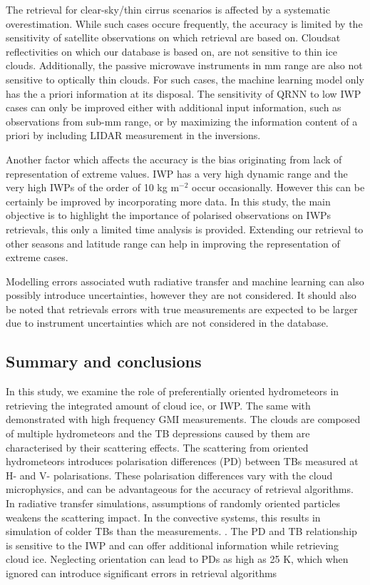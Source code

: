 \documentclass[amt, manuscript]{copernicus}
\begin{document}
The retrieval for clear-sky/thin cirrus scenarios is affected by a systematic overestimation. While such cases occure frequently, the accuracy is limited by the sensitivity of satellite observations on which retrieval are based on. Cloudsat reflectivities on which our database is based on, are not sensitive to thin ice clouds. Additionally, the passive microwave instruments in mm range are also not sensitive to optically thin clouds. For such cases, the machine learning model only has the a priori information at its disposal. The sensitivity of QRNN to low IWP cases can only be improved either with additional input information, such as observations from sub-mm range, or by maximizing the information content of a priori by including LIDAR measurement in the inversions.

Another factor which affects the accuracy is the bias originating from lack of representation of extreme values. IWP has a very high dynamic range and the very high IWPs of the order of 10\,\,kg m$^{-2}$ occur occasionally. However this can be certainly be improved by incorporating more data. In this study, the main objective is to highlight the importance of polarised observations on IWPs retrievals, this only a limited time analysis is provided. Extending our retrieval to other seasons and latitude range can help in improving the representation of extreme cases. 

Modelling errors associated wuth radiative transfer and machine learning can also possibly introduce uncertainties, however they are not considered. 
It should also be noted that retrievals errors with true measurements are expected to be larger due to instrument uncertainties which are not considered in the database. 




\subsection{Summary and conclusions}
%
\label{sec:conclusions}

In this study, we examine the role of preferentially oriented hydrometeors in retrieving the integrated amount of cloud ice, or IWP. The same with demonstrated with high frequency GMI measurements. The clouds are composed of multiple hydrometeors and the TB depressions caused by them are characterised by their scattering effects. The scattering from oriented hydrometeors introduces polarisation differences (PD) between TBs measured at H- and V- polarisations. These polarisation differences vary with the cloud microphysics, and can be advantageous for the accuracy of retrieval algorithms.  In radiative transfer simulations, assumptions of randomly oriented particles weakens the scattering impact. In the convective systems, this results in simulation of colder TBs than the measurements. . The PD and TB relationship is sensitive to the IWP and can offer additional information while retrieving cloud ice. Neglecting orientation can lead to PDs as high as 25\,\,K, which when ignored can introduce significant errors in retrieval algorithms 
\end{document}
